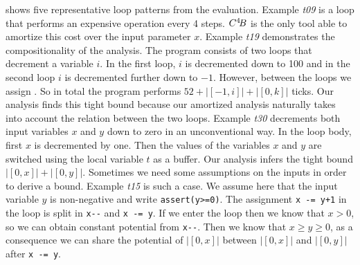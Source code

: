 \documentclass{sigplanconf}
\newcommand{\pref}[1]{\prettyref{#1}}
\begin{document}
\pref{fig:compar} shows five representative loop patterns from the
evaluation.
Example \emph{t09} is a loop that performs an expensive operation every
4 steps.  $C^4\!B$ is the only tool able to amortize this cost over
the input parameter $x$.
Example \emph{t19}
demonstrates the compositionality of the analysis.  The program consists
of two loops that decrement a variable $i$.  In the first loop, $i$ is
decremented down to 100 and in the second loop $i$ is decremented further
down to $-1$.  However, between the loops we assign .
So in total the program performs $52 + |[-1,i]| + |[0,k]|$ ticks.
Our analysis finds this tight bound because our amortized analysis
naturally takes into account the relation between the two loops.
Example \emph{t30} decrements both input variables $x$ and $y$ down to
zero in an unconventional way.  In the loop body, first $x$ is decremented
by one.  Then the values of the variables $x$ and $y$ are switched using
the local variable $t$ as a buffer.  Our analysis infers the tight
bound $|[0,x]|+|[0,y]|$.  Sometimes we need some assumptions on the
inputs in order to derive a bound.  Example \emph{t15} is such a case.
We assume here that the input variable $y$ is non-negative and write
\lstinline{assert(y>=0)}.  The assignment \lstinline{x -= y+1} in the
loop is split in \lstinline{x--} and \lstinline{x -= y}. If we enter the
loop then we know that $x>0$, so we can obtain constant potential from
\lstinline{x--}.  Then we know that $x\geq y\geq 0$, as a consequence
we can share the potential of $|[0,x]|$ between $|[0,x]|$ and $|[0,y]|$
after \lstinline{x -= y}.  %
\end{document}
